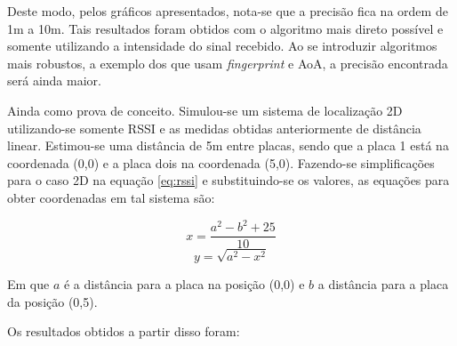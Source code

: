 Deste modo, pelos gráficos apresentados, nota-se que a precisão fica na ordem de 1m a 10m. Tais resultados foram obtidos com o algoritmo mais direto possível e somente utilizando a intensidade do sinal recebido. Ao se introduzir algoritmos mais robustos, a exemplo dos que usam \textit{fingerprint} e AoA, a precisão encontrada será ainda maior.

Ainda como prova de conceito. Simulou-se um sistema de localização 2D utilizando-se somente RSSI e as medidas obtidas anteriormente de distância linear.
Estimou-se uma distância de 5m entre placas, sendo que a placa 1 está na coordenada (0,0) e a placa dois na coordenada (5,0).
Fazendo-se simplificações para o caso 2D na equação \ref{eq:rssi} e substituindo-se os valores, as equações para obter coordenadas em tal sistema são:

\begin{equation}
    x = \frac{a^2 - b^2 + 25}{10}
\end{equation}
\begin{equation}
    y = \sqrt{a^2 - x^2}
\end{equation}

Em que \(a\) é a distância para a placa na posição (0,0) e \(b\) a distância para a placa da posição (0,5).

Os resultados obtidos a partir disso foram:

